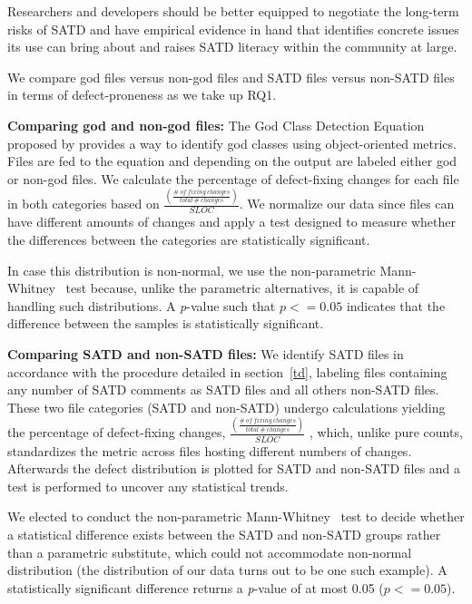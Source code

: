 Researchers and developers should be better equipped to negotiate the long-term risks of SATD and have empirical evidence in hand that identifies concrete issues its use can bring about and raises SATD literacy within the community at large.


We compare god files versus non-god files and SATD files versus non-SATD files in terms of defect-proneness as we take up RQ1.


\noindent\textbf{Comparing god and non-god files:}
The God Class Detection Equation proposed by \cite{marinescu2004detection} provides a way to identify god classes using object-oriented metrics. Files are fed to the equation and depending on the output are labeled either god or non-god files. We calculate the percentage of defect-fixing changes for each file in both categories based on $\frac{\left (\frac{\#~of~fixing~changes}{total~\#~changes} \right )}{SLOC}$. We normalize our data since files can have different amounts of changes and apply a test designed to measure whether the differences between the categories are statistically significant.

In case this distribution is non-normal, we use the non-parametric Mann-Whitney~\cite{mann1947test} test because, unlike the parametric alternatives, it is capable of handling such distributions. A \textit{p}-value such that $p <= 0.05$ indicates that the difference between the samples is statistically significant.


\noindent\textbf{Comparing SATD and non-SATD files:}
We identify SATD files in accordance with the procedure detailed in section~\ref{td}, labeling files containing any number of SATD comments as SATD files and all others non-SATD files. These two file categories (SATD and non-SATD) undergo calculations yielding the percentage of defect-fixing changes, $\frac{\left (\frac{\#~of~fixing~changes}{total~\#~changes} \right )}{SLOC}$ , which, unlike pure counts, standardizes the metric across files hosting different numbers of changes. Afterwards the defect distribution is plotted for SATD and non-SATD files and a test is performed to uncover any statistical trends.

We elected to conduct the non-parametric Mann-Whitney~\cite{mann1947test} test to decide whether a statistical difference exists between the SATD and non-SATD groups rather than a parametric substitute, which could not accommodate non-normal distribution (the distribution of our data turns out to be one such example). A statistically significant difference returns a \textit{p}-value of at most 0.05 ($p <= 0.05$).



